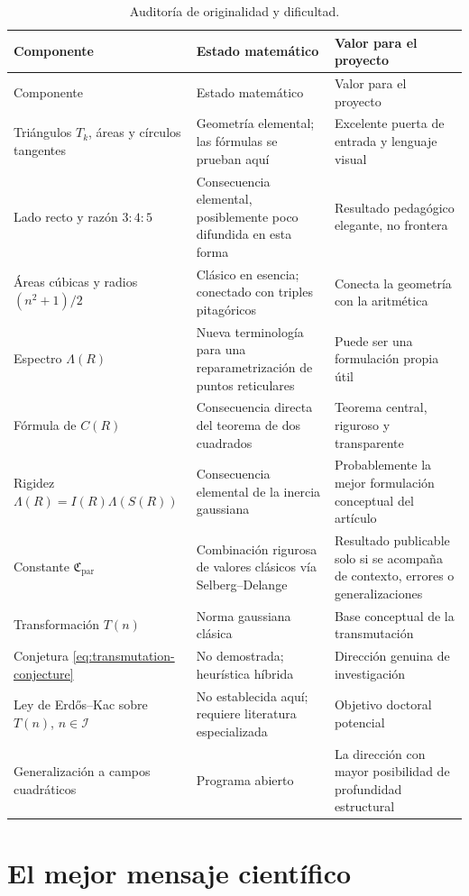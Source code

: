 \documentclass[11pt,a4paper,openany]{report}
\newcommand{\Iset}{\mathcal{I}}
\newcommand{\Lam}{\Lambda}
\begin{document}
\begin{longtable}{>{\raggedright\arraybackslash}p{4.1cm}>{\raggedright\arraybackslash}p{5.1cm}>{\raggedright\arraybackslash}p{5.1cm}}
\caption{Auditoría de originalidad y dificultad.}\label{tab:novelty-audit}\\
\toprule
Componente&Estado matemático&Valor para el proyecto\\
\midrule
\endfirsthead
\toprule
Componente&Estado matemático&Valor para el proyecto\\
\midrule
\endhead
Triángulos \(T_k\), áreas y círculos tangentes&Geometría elemental; las fórmulas se prueban aquí&Excelente puerta de entrada y lenguaje visual\\
Lado recto y razón \(3:4:5\)&Consecuencia elemental, posiblemente poco difundida en esta forma&Resultado pedagógico elegante, no frontera\\
Áreas cúbicas y radios \((n^2+1)/2\)&Clásico en esencia; conectado con triples pitagóricos&Conecta la geometría con la aritmética\\
Espectro \(\Lam(R)\)&Nueva terminología para una reparametrización de puntos reticulares&Puede ser una formulación propia útil\\
Fórmula de \(C(R)\)&Consecuencia directa del teorema de dos cuadrados&Teorema central, riguroso y transparente\\
Rigidez \(\Lam(R)=I(R)\Lam(S(R))\)&Consecuencia elemental de la inercia gaussiana&Probablemente la mejor formulación conceptual del artículo\\
Constante \(\mathfrak C_{\mathrm{par}}\)&Combinación rigurosa de valores clásicos vía Selberg--Delange&Resultado publicable solo si se acompaña de contexto, errores o generalizaciones\\
Transformación \(T(n)\)&Norma gaussiana clásica&Base conceptual de la transmutación\\
Conjetura \eqref{eq:transmutation-conjecture}&No demostrada; heurística híbrida&Dirección genuina de investigación\\
Ley de Erdős--Kac sobre \(T(n)\), \(n\in\Iset\)&No establecida aquí; requiere literatura especializada&Objetivo doctoral potencial\\
Generalización a campos cuadráticos&Programa abierto&La dirección con mayor posibilidad de profundidad estructural\\
\bottomrule
\end{longtable}

\section{El mejor mensaje científico}
\end{document}
